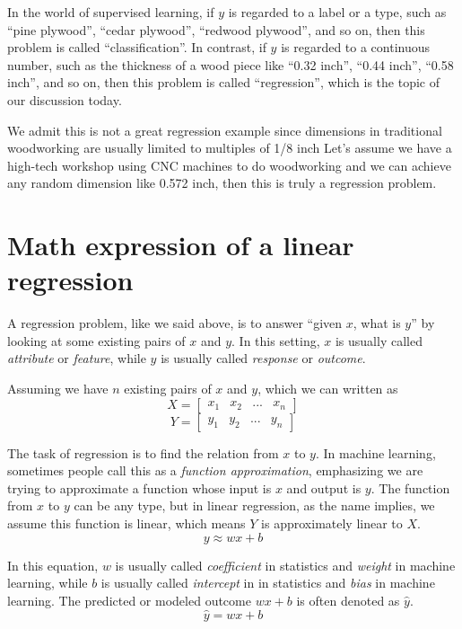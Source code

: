 \documentclass[
	letterpaper
]{article}
\begin{document}
In the world of supervised learning, if $y$ is regarded to a label or a type, such as ``pine plywood'', ``cedar plywood'', ``redwood plywood'', and so on, then this problem is called ``classification''.
In contrast, if $y$ is regarded to a continuous number, such as the thickness of a wood piece like ``0.32 inch'', ``0.44 inch'', ``0.58 inch'', and so on, then this problem is called ``regression'', which is the topic of our discussion today.

We admit this is not a great regression example since dimensions in traditional woodworking are usually limited to multiples of 1/8 inch
Let's assume we have a high-tech workshop using CNC machines to do woodworking and we can achieve any random dimension like 0.572 inch, then this is truly a regression problem.

\section{Math expression of a linear regression}
A regression problem, like we said above, is to answer ``given $x$, what is $y$'' by looking at some existing pairs of $x$ and $y$.
In this setting, $x$ is usually called \textit{attribute} or \textit{feature}, while $y$ is usually called \textit{response} or \textit{outcome}.

Assuming we have $n$ existing pairs of $x$ and $y$, which we can written as 
\begin{equation}
X = \begin{bmatrix}
x_1 & x_2 & ... & x_n
\end{bmatrix}
\end{equation}
\begin{equation}
Y = \begin{bmatrix}
y_1 & y_2 & ... & y_n
\end{bmatrix}
\end{equation}

The task of regression is to find the relation from $x$ to $y$.
In machine learning, sometimes people call this as a \textit{function approximation}, emphasizing we are trying to approximate a function whose input is $x$ and output is $y$.
The function from $x$ to $y$ can be any type, but in linear regression, as the name implies, we assume this function is linear, which means $Y$ is approximately linear to $X$.
\begin{equation}
y \approx wx+b
\end{equation}

In this equation, $w$ is usually called \textit{coefficient} in statistics and \textit{weight} in machine learning, while $b$ is usually called \textit{intercept} in in statistics and \textit{bias} in machine learning.
The predicted or modeled outcome $wx+b$ is often denoted as $\hat y$.
\begin{equation}
\hat y = wx+b
\end{equation}
\end{document}
